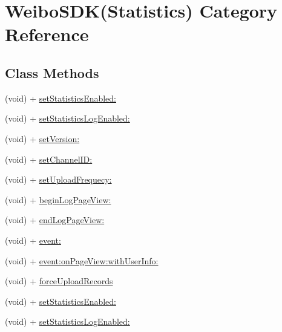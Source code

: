\hypertarget{category_weibo_s_d_k_07_statistics_08}{}\section{Weibo\+S\+DK(Statistics) Category Reference}
\label{category_weibo_s_d_k_07_statistics_08}
\subsection*{Class Methods}
\begin{DoxyCompactItemize}
\item 
(void) + \mbox{\hyperlink{category_weibo_s_d_k_07_statistics_08_a0b32ee3e2b30059b93e7dea204b43818}{set\+Statistics\+Enabled\+:}}
\item 
(void) + \mbox{\hyperlink{category_weibo_s_d_k_07_statistics_08_a2e009db32a6d059ff53e35ac211d57f9}{set\+Statistics\+Log\+Enabled\+:}}
\item 
(void) + \mbox{\hyperlink{category_weibo_s_d_k_07_statistics_08_ac68e6c65a10fa6c5f04c1293050a7127}{set\+Version\+:}}
\item 
(void) + \mbox{\hyperlink{category_weibo_s_d_k_07_statistics_08_a8d9fad53942642ec304ecba4734e05c1}{set\+Channel\+I\+D\+:}}
\item 
(void) + \mbox{\hyperlink{category_weibo_s_d_k_07_statistics_08_a6790cf45454697f2b846eb080a130ef2}{set\+Upload\+Frequecy\+:}}
\item 
(void) + \mbox{\hyperlink{category_weibo_s_d_k_07_statistics_08_ae9b18093f71e740c51f254fb517e818d}{begin\+Log\+Page\+View\+:}}
\item 
(void) + \mbox{\hyperlink{category_weibo_s_d_k_07_statistics_08_aa9460b8e4fd90f3b437207c55ef2c40e}{end\+Log\+Page\+View\+:}}
\item 
(void) + \mbox{\hyperlink{category_weibo_s_d_k_07_statistics_08_af035b5557e6dd544e282689323d8c4aa}{event\+:}}
\item 
(void) + \mbox{\hyperlink{category_weibo_s_d_k_07_statistics_08_a7c433640d9ed0d396166f2777a428277}{event\+:on\+Page\+View\+:with\+User\+Info\+:}}
\item 
(void) + \mbox{\hyperlink{category_weibo_s_d_k_07_statistics_08_ab5d6291270ebed0084a505e009bc15a2}{force\+Upload\+Records}}
\item 
(void) + \mbox{\hyperlink{category_weibo_s_d_k_07_statistics_08_a0b32ee3e2b30059b93e7dea204b43818}{set\+Statistics\+Enabled\+:}}
\item 
(void) + \mbox{\hyperlink{category_weibo_s_d_k_07_statistics_08_a2e009db32a6d059ff53e35ac211d57f9}{set\+Statistics\+Log\+Enabled\+:}}

\end{DoxyCompactItemize}
